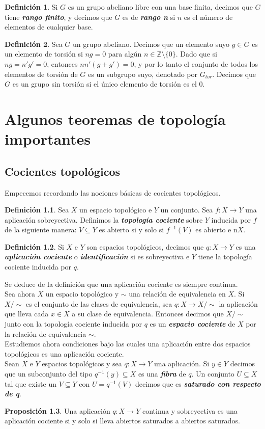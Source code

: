\documentclass[10pt]{report}
\newcommand{\enfatiza}[1]{\textbf{\textit{#1}}}
\theoremstyle{definition}
\newtheorem{defin}{Definición}[section]
\newtheorem{prop}[defin]{Proposición}
\begin{document}
\begin{defin}
Si $G$ es un grupo abeliano libre con una base finita, decimos que $G$ tiene \enfatiza{rango finito}, y decimos que $G$ es de \enfatiza{rango n} si $n$ es el número de elementos de cualquier base.
\end{defin}

\begin{defin}
Sea $G$ un grupo abeliano. Decimos que un elemento suyo $g\in G$ es un elemento de torsión si $ng=0$ para algún $n\in \mathbb{Z}\setminus \{ 0 \}$. Dado que si $ng=n'g'=0$, entonces $nn'(g+g')=0$, y por lo tanto el conjunto de todos los elementos de torsión de $G$ es un subgrupo suyo, denotado por $G_{tor}$. Decimos que $G$ es un grupo sin torsión si el único elemento de torsión es el 0. 
\end{defin}
\chapter{Algunos teoremas de topología importantes}


\section{Cocientes topológicos}
Empecemos recordando las nociones básicas de cocientes topológicos.
\begin{defin}
Sea $X$ un espacio topológico e $Y$ un conjunto. Sea $f:X\to Y$ una aplicación sobreyectiva. Definimos la \enfatiza{topología cociente} sobre $Y$ inducida por $f$ de la siguiente manera: $V\subseteq Y$ es abierto si y solo si $f^{-1}(V)$ es abierto e n$X$.
\end{defin}
\begin{defin}
Si $X$ e $Y$ son espacios topológicos, decimos que  $q:X\to Y$ es una \enfatiza{aplicación cociente} o \enfatiza{identificación} si es sobreyectiva e $Y$ tiene la topología cociente inducida por $q$.
\end{defin}
Se deduce de la definición que una aplicación cociente es siempre continua.\\
Sea ahora $X$ un espacio topológico y $\sim$ una relación de equivalencia en $X$. Si $X/\sim$ es el conjunto de las clases de equivalencia, sea $q:X\to X/\sim$ la aplicación que lleva cada $x\in X$ a su clase de equivalencia. Entonces decimos que $X/\sim$ junto con la topología cociente inducida por $q$ es un \enfatiza{espacio cociente} de $X$ por la relación de equivalencia $\sim$.\\
Estudiemos ahora condiciones bajo las cuales una aplicación entre dos espacios topológicos es una aplicación cociente.\\
Sean $X$ e $Y$ espacios topológicos y sea $q:X\to Y$ una aplicación. Si $y\in Y$ decimos que un subconjunto del tipo $q^{-1}(y)\subseteq X$ es una \enfatiza{fibra} de $q$. Un conjunto $U\subseteq X$ tal que existe un $V\subseteq Y$ con $U=q^{-1}(V)$ decimos que es \enfatiza{saturado con respecto de q}.
\begin{prop}
Una aplicación $q:X\to Y$ continua y sobreyectiva es una aplicación cociente si y solo si lleva abiertos saturados a abiertos saturados.
\end{prop}
\end{document}
